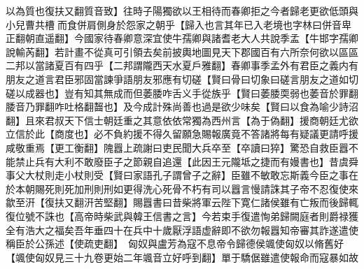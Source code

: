 以為質也復扶又翻質音致】往時子陽獨欲以王相待而春卿拒之今者歸老更欲低頭與小兒曹共槽而食併肩側身於怨家之朝乎【歸入也言其年已入老境也字林曰併音卑正翻朝直遥翻】今國家待春卿意深宜使牛孺卿與諸耆老大人共說季孟【牛邯字孺卿說輸芮翻】若計畫不從真可引領去矣前披輿地圖見天下郡國百有六所奈何欲以區區二邦以當諸夏百有四乎【二邦謂隴西天水夏戶雅翻】春卿事季孟外有君臣之義内有朋友之道言君臣邪固當諫爭語朋友邪應有切磋【賢曰骨曰切象曰磋言朋友之道如切磋以成器也】豈有知其無成而但萎腇咋舌义手從族乎【賢曰萎腇耎弱也萎音於罪翻腇音乃罪翻咋吐格翻齧也】及今成計殊尚善也過是欲少味矣【賢曰以食為喻少詩沼翻】且來君叔天下信士朝廷重之其意依依常獨為西州言【為于偽翻】援商朝廷尤欲立信於此【商度也】必不負約援不得久留願急賜報廣竟不答諸將每有疑議更請呼援咸敬重焉【更工衡翻】隗囂上疏謝曰吏民聞大兵卒至【卒讀曰猝】驚恐自救臣囂不能禁止兵有大利不敢廢臣子之節親自追還【此因王元隴坻之捷而有嫚書也】昔虞舜事父大杖則走小杖則受【賢曰家語孔子謂曾子之辭】臣雖不敏敢忘斯義今臣之事在於本朝賜死則死加刑則刑如更得洗心死骨不朽有司以囂言慢請誅其子帝不忍復使來歙至汧【復扶又翻汧苦堅翻】賜囂書曰昔柴將軍云陛下寛仁諸侯雖有亡叛而後歸輒復位號不誅也【高帝時柴武與韓王信書之言】今若束手復遣恂弟歸闕庭者則爵禄獲全有浩大之福矣吾年垂四十在兵中十歲厭浮語虚辭即不欲勿報囂知帝審其詐遂遣使稱臣於公孫述【使疏吏翻】　匈奴與盧芳為寇不息帝令歸德侯颯使匈奴以脩舊好【颯使匈奴見三十九卷更始二年颯音立好呼到翻】單于驕倨雖遣使報命而寇暴如故

